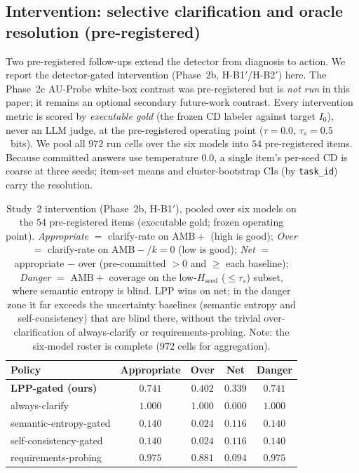 \documentclass[acmsmall,screen,review,anonymous]{acmart}
\newcommand{\cd}{\textsf{CD}}
\newcommand{\Hseed}{\ensuremath{H_{\mathrm{seed}}}}
\begin{document}
\subsection{Intervention: selective clarification and oracle resolution (pre-registered)}
\label{sec:study2-intervention}
Two pre-registered follow-ups extend the detector from diagnosis to action. We report the detector-gated
intervention (Phase~2b, H-B1$'$/H-B2$'$) here. The Phase~2c AU-Probe white-box contrast was pre-registered
but is \emph{not run} in this paper; it remains an optional secondary future-work contrast. Every intervention metric is scored by \emph{executable gold} (the frozen
\cd{} labeler against target $I_0$), never an LLM judge, at the pre-registered operating point
($\tau{=}0.0$, $\tau_s{=}0.5$~bits). We pool all $972$ run cells over the six models into $54$ pre-registered items. Because committed answers use temperature $0.0$, a single item's per-seed \cd{} is coarse at three
seeds; item-set means and cluster-bootstrap CIs (by \texttt{task\_id}) carry the resolution.

\begin{table}[t]
\centering
\caption{Study~2 intervention (Phase~2b, H-B1$'$), pooled over six models on the $54$ pre-registered items
(executable gold; frozen operating point). \emph{Appropriate} $=$ clarify-rate on $\mathrm{AMB}{+}$ (high is
good); \emph{Over} $=$ clarify-rate on $\mathrm{AMB}{-}$/$k{=}0$ (low is good); \emph{Net} $=$
appropriate $-$ over (pre-committed $>0$ and $\ge$ each baseline); \emph{Danger} $=$ $\mathrm{AMB}{+}$
coverage on the low-\Hseed{} ($\le\!\tau_s$) subset, where semantic entropy is blind. LPP wins on net; in the
danger zone it far exceeds the uncertainty baselines (semantic entropy and self-consistency) that are blind there,
without the trivial over-clarification of always-clarify or requirements-probing. Note: the six-model roster
is complete ($972$ cells for aggregation).}
\label{tab:study2-intervention}
\footnotesize
\setlength{\tabcolsep}{4pt}
\begin{tabular}{@{}lcccc@{}}
\toprule
Policy & Appropriate & Over & Net & Danger \\
\midrule
\textbf{LPP-gated (ours)} & $0.741$ & $0.402$ & $\mathbf{0.339}$ & $\mathbf{0.741}$ \\
always-clarify           & $1.000$ & $1.000$ & $0.000$ & $1.000$ \\
semantic-entropy-gated   & $0.140$ & $0.024$ & $0.116$ & $0.140$ \\
self-consistency-gated   & $0.140$ & $0.024$ & $0.116$ & $0.140$ \\
requirements-probing     & $0.975$ & $0.881$ & $0.094$ & $0.975$ \\
\bottomrule
\end{tabular}
\end{table}
\end{document}
